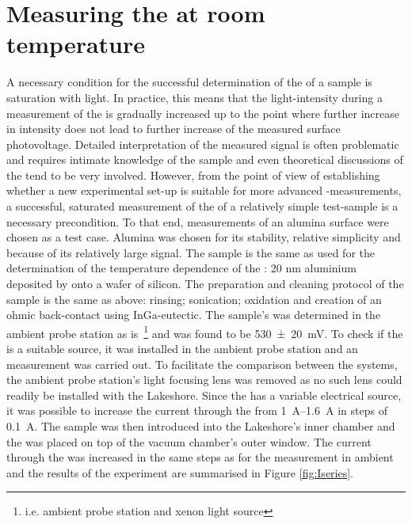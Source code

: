 \section{Measuring the \spv{} at room temperature}
A necessary condition for the successful determination of the \spv{} of a sample is saturation with light. In practice, this means that the light-intensity during a measurement of the \spv{} is gradually increased up to the point where further increase in intensity does not lead to further increase of the measured surface photovoltage. Detailed interpretation of the measured signal is often problematic and requires intimate knowledge of the sample and even theoretical discussions of the \spv{} tend to be very involved. However, from the point of view of establishing whether a new experimental set-up is suitable for more advanced \spv{}-measurements, a successful, saturated measurement of the \spv{} of a relatively simple test-sample is a necessary precondition. To that end, \spv{} measurements of an alumina surface were chosen as a test case. Alumina was chosen for its stability, relative simplicity and because of its relatively large \spv{} signal. The sample is the same as used for the determination of the temperature dependence of the \cpd{}: 20 nm aluminium deposited by \ald{} onto a wafer of silicon. The preparation and cleaning protocol of the sample is the same as above: rinsing; sonication; oxidation and creation of an ohmic back-contact using InGa-eutectic. The sample's \spv{} was determined in the ambient probe station as is~\footnote{i.e. ambient probe station and xenon light source} and was found to be \SI{530+-20}{\milli\volt}. To check if the \led{} is a suitable source, it was installed in the ambient probe station and an \spv{} measurement was carried out. To facilitate the comparison between the systems, the ambient probe station's light focusing lens was removed as no such lens could readily be installed with the Lakeshore. Since the \led{} has a variable electrical source, it was possible to increase the current through the \led{} from \SIrange{1}{1.6}{\ampere} in steps of \SI{0.1}{\ampere}. The sample was then introduced into the Lakeshore's inner chamber and the \led{} was placed on top of the vacuum chamber's outer window. The current through the \led{} was increased in the same steps as for the measurement in ambient and the results of the experiment are summarised in Figure \ref{fig:Iseries}.
